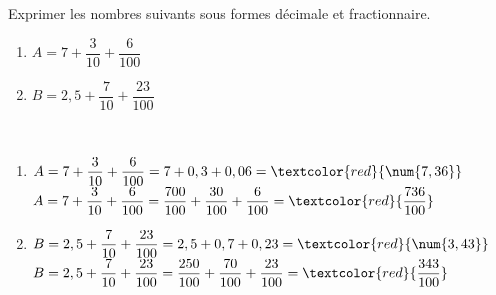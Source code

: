 \begin{exercice*} %
   Exprimer les nombres suivants sous formes décimale et fractionnaire. \smallskip
   \begin{multicols}{2}
      \begin{enumerate}
         \item $A=7+\dfrac{3}{10}+\dfrac{6}{100}$
         \item $B=2,5+\dfrac{7}{10}+\dfrac{23}{100}$
      \end{enumerate}
   \end{multicols}

\end{exercice*}

\begin{corrige}
   \ \\ [-5mm]
   \begin{enumerate}
      \item $A=7+\dfrac{3}{10}+\dfrac{6}{100} = 7+0,3+0,06 =\textcolor{red}{\num{7,36}}$ \\ [2mm]
         $A=7+\dfrac{3}{10}+\dfrac{6}{100} =\dfrac{700}{100}+\dfrac{30}{100}+\dfrac{6}{100} =\textcolor{red}{\dfrac{736}{100}}$ \medskip
      \item $B=2,5+\dfrac{7}{10}+\dfrac{23}{100} = 2,5+0,7+0,23 =\textcolor{red}{\num{3,43}}$ \\ [2mm]
         $B=2,5+\dfrac{7}{10}+\dfrac{23}{100} =\dfrac{250}{100}+\dfrac{70}{100}+\dfrac{23}{100} =\textcolor{red}{\dfrac{343}{100}}$
   \end{enumerate}
\end{corrige}